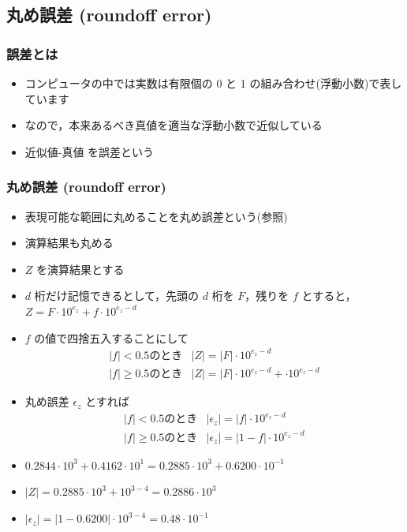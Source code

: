\subsection{丸め誤差 (roundoff error)}
\begin{frame}[shrink]
\frametitle{誤差とは}
  \begin{itemize}
\item コンピュータの中では実数は有限個の 0 と 1 の組み合わせ(浮動小数)で表しています
\item なので，本来あるべき真値を適当な浮動小数で近似している
\item 近似値-真値 を誤差という
  \end{itemize}
\end{frame}
\begin{frame}[shrink]
\frametitle{丸め誤差 (roundoff error)}
  \begin{itemize}
\item 表現可能な範囲に丸めることを丸め誤差という(参照)
\item 演算結果も丸める
\item $Z$ を演算結果とする
\item $d$ 桁だけ記憶できるとして，先頭の $d$ 桁を $F$，残りを $f$ とすると，\(Z=F\cdot 10^{e_z}+f\cdot 10^{e_z-d}\)
\item $f$ の値で四捨五入することにして
    \begin{displaymath}
      \begin{array}{ll}
|f|<0.5 \mbox{のとき} & |Z|=|F|\cdot 10^{e_z-d}\\
|f|\geq 0.5 \mbox{のとき} & |Z|=|F|\cdot 10^{e_z-d}+\cdot 10^{e_z-d}
      \end{array}
    \end{displaymath}
\item 丸め誤差 $\epsilon_z$ とすれば
    \begin{displaymath}
      \begin{array}{ll}
|f|<0.5 \mbox{のとき} & |\epsilon_z|=|f|\cdot 10^{e_z-d}\\
|f|\geq 0.5 \mbox{のとき} & |\epsilon_z|=|1-f|\cdot 10^{e_z-d}
      \end{array}
    \end{displaymath}
  \end{itemize}
  \begin{example}
    \begin{itemize}
\item \(0.2844\cdot 10^3+0.4162\cdot 10^1=0.2885\cdot 10^3+0.6200\cdot 10^{-1}\)
\item \(|Z|=0.2885\cdot 10^3+10^{3-4}=0.2886\cdot 10^3\)
\item \(|\epsilon_z|=|1-0.6200|\cdot 10^{3-4}=0.48\cdot 10^{-1}\)
    \end{itemize}
  \end{example}
\end{frame}
